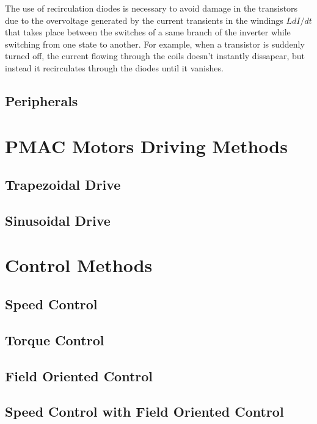 The use of recirculation diodes is necessary to avoid damage in the transistors due to the overvoltage generated by the current transients in the windings $L dI/dt$ that takes place between the switches of a same branch of the inverter while switching from one state to another. For example, when a transistor is suddenly turned off, the current flowing through the coils doesn't instantly dissapear, but instead it recirculates through the diodes until it vanishes.

\subsection{Peripherals}




\section{PMAC Motors Driving Methods}\label{section:driving_methods}

\subsection{Trapezoidal Drive}

\subsection{Sinusoidal Drive}




\section{Control Methods}

\subsection{Speed Control}

\subsection{Torque Control}

\subsection{Field Oriented Control}

\subsection{Speed Control with Field Oriented Control}



